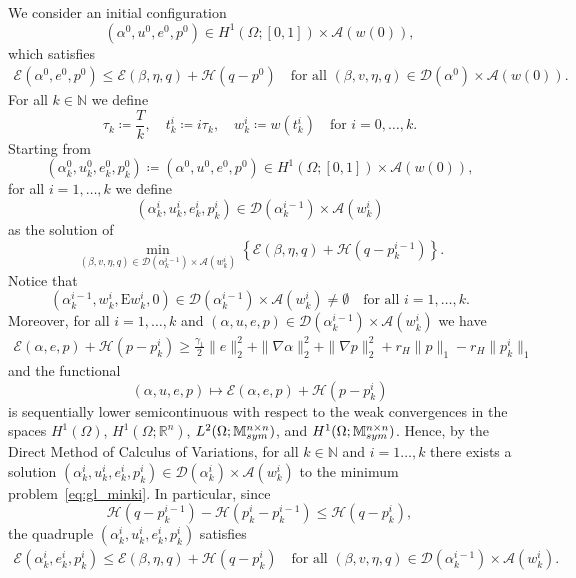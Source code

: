 \documentclass[reqno]{amsart}
\theoremstyle{definition}
\numberwithin{equation}{section}
\def\R {\mathbb R}
\def\N {\mathbb N}
\def\M {\mathbb M^{n\times n}_{\rm sym}}
\def\EE {\mathrm{E}}
\begin{document}
We consider an initial configuration $$(\alpha^0,u^0,e^0,p^0)\in H^1(\Omega;[0,1])\times\mathcal A(w(0)),$$ 
which satisfies
\begin{align}\label{eq:ic}
\mathcal E(\alpha^0,e^0,p^0)\le \mathcal E(\beta,\eta,q)+\mathcal H(q-p^0)\quad\text{for all $(\beta,v,\eta,q)\in \mathcal D(\alpha^0)\times \mathcal A(w(0))$}.
\end{align}
For all $k\in\N$ we define
\begin{equation*}
\tau_k\coloneqq \frac{T}{k},\quad t_k^i\coloneqq i\tau_k,\quad w_k^i\coloneqq w(t_k^i)\quad\text{for $i=0,\dots,k$}.
\end{equation*}
Starting from
\begin{equation*}
(\alpha_k^0,u_k^0,e_k^0,p_k^0)\coloneqq (\alpha^0,u^0,e^0,p^0)\in H^1(\Omega;[0,1])\times \mathcal A(w(0)),
\end{equation*}
for all $i=1,\dots,k$ we define
\begin{equation*}
(\alpha_k^i,u_k^i,e_k^i,p_k^i)\in \mathcal D(\alpha_k^{i-1})\times \mathcal A(w_k^i)
\end{equation*}
as the solution of
\begin{equation}\label{eq:gl_minki}
\min_{(\beta,v,\eta,q)\in \mathcal D(\alpha_k^{i-1})\times \mathcal A(w_k^i)}\left\{\mathcal E(\beta,\eta,q)+\mathcal H(q-p_k^{i-1})\right\}.
\end{equation}
Notice that 
\begin{equation*}
(\alpha_k^{i-1},w_k^i,\EE w_k^i,0)\in \mathcal D(\alpha_k^{i-1})\times \mathcal A(w_k^i)\neq\emptyset\quad\text{for all $i=1,\dots,k$}.
\end{equation*}
Moreover, for all $i=1,\dots,k$ and $(\alpha,u,e,p)\in\mathcal D(\alpha_k^{i-1})\times \mathcal A(w_k^i)$ we have
\begin{align*}
\mathcal E(\alpha,e,p)+\mathcal H(p-p_k^i)\ge \frac{\gamma_1}{2}\|e\|_2^2+\|\nabla\alpha\|_2^2+\|\nabla p\|_2^2+r_H\|p\|_1-r_H\|p_k^i\|_1
\end{align*}
and the functional
\begin{equation*}
(\alpha,u,e,p)\mapsto \mathcal E(\alpha,e,p)+\mathcal H(p-p_k^i)
\end{equation*}
is sequentially lower semicontinuous with respect to the weak convergences in the spaces $H^1(\Omega)$, $H^1(\Omega;\R^n)$, $L^2(\Omega;\M)$, and $H^1(\Omega;\M)$. Hence, by the Direct Method of Calculus of Variations, for all $k\in\N$ and $i=1\dots,k$ there exists a solution $(\alpha_k^i,u_k^i,e_k^i,p_k^i)\in\mathcal D(\alpha_k^i)\times\mathcal A(w_k^i)$ to the minimum problem~\eqref{eq:gl_minki}. In particular, since 
$$\mathcal H(q-p_k^{i-1})-\mathcal H(p_k^i-p_k^{i-1})\le \mathcal H(q-p_k^i),$$
the quadruple $(\alpha_k^i,u_k^i,e_k^i,p_k^i)$ satisfies
\begin{align}\label{eq:gl_stki}
\mathcal E(\alpha_k^i,e_k^i,p_k^i)\le \mathcal E(\beta,\eta,q)+\mathcal H(q-p_k^i)\quad\text{for all $(\beta,v,\eta,q)\in \mathcal D(\alpha_k^{i-1})\times \mathcal A(w_k^i)$.}
\end{align}
\end{document}
